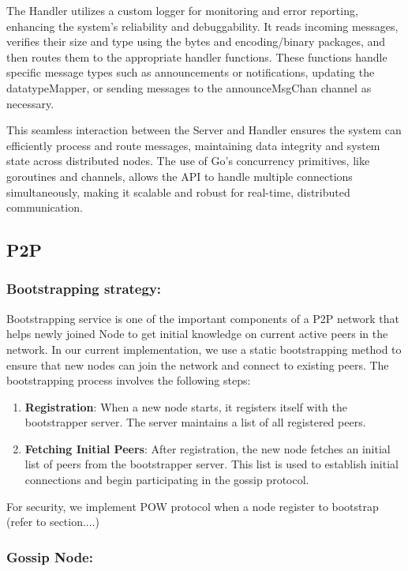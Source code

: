 The Handler utilizes a custom logger for monitoring and error reporting, enhancing the system's reliability and debuggability. It reads incoming messages, verifies their size and type using the bytes and encoding/binary packages, and then routes them to the appropriate handler functions. These functions handle specific message types such as announcements or notifications, updating the datatypeMapper, or sending messages to the announceMsgChan channel as necessary.

This seamless interaction between the Server and Handler ensures the system can efficiently process and route messages, maintaining data integrity and system state across distributed nodes. The use of Go's concurrency primitives, like goroutines and channels, allows the API to handle multiple connections simultaneously, making it scalable and robust for real-time, distributed communication.

\subsection{P2P}

\subsubsection{Bootstrapping strategy:}

Bootstrapping service is one of the important components of a P2P network that helps newly joined Node to get initial knowledge on current active peers in the network. 
In our current implementation, we use a static bootstrapping method to ensure that new nodes can join the network and connect to existing peers. The bootstrapping process involves the following steps:
\begin{enumerate}
    \item \textbf{Registration}: When a new node starts, it registers itself with the bootstrapper server. The server maintains a list of all registered peers.
    \item \textbf{Fetching Initial Peers}: After registration, the new node fetches an initial list of peers from the bootstrapper server. This list is used to establish initial connections and begin participating in the gossip protocol.
\end{enumerate}

For security, we implement POW protocol when a node register to bootstrap (refer to section....)

\subsubsection{Gossip Node:}

